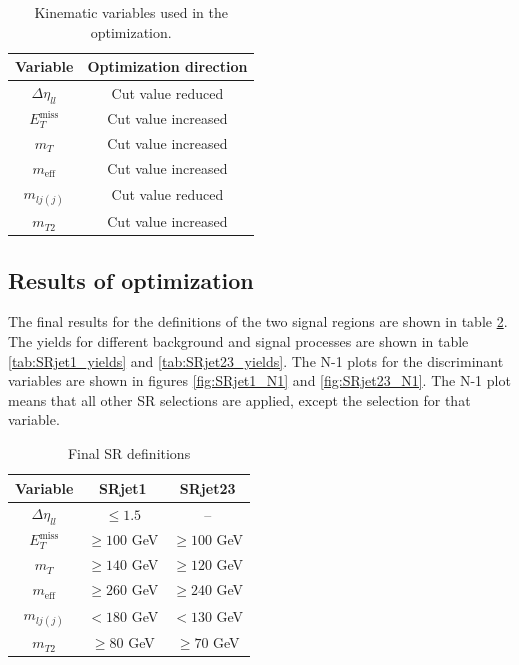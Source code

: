 \begin{table}[htbp]
\centering
\begin{tabular}{|c|c|}
\hline
Variable & Optimization direction \\
\hline
\hline
$\Delta \eta_{ll}$ & Cut value reduced \\
\hline
$E_T^{\text{miss}}$ & Cut value increased \\
\hline
$m_T$ & Cut value increased \\
\hline
$m_{\text{eff}}$ & Cut value increased \\
\hline
$m_{lj(j)}$ & Cut value reduced \\
\hline
$m_{T2}$ & Cut value increased \\
\hline
\end{tabular}
\caption{Kinematic variables used in the optimization.}
\label{tab:variables_optimization}
\end{table}

\subsection{Results of optimization}
The final results for the definitions of the two signal regions are shown in table \ref{tab:SR_Def}.
The yields for different background and signal processes are shown in table \ref{tab:SRjet1_yields} and \ref{tab:SRjet23_yields}.
The N-1 plots for the discriminant variables are shown in figures \ref{fig:SRjet1_N1} and \ref{fig:SRjet23_N1}.
The N-1 plot means that all other SR selections are applied, except the selection for that variable.

\begin{table}[htpb]
\centering
\begin{tabular}{|c|c|c|}
\hline
Variable &  SRjet1 & SRjet23 \\ \hline
$\Delta\eta_{ll}$ & $\leq 1.5$ &  -- \\
$E_T^{\text{miss}}$ &  $\geq 100 $ GeV  & $\geq 100$ GeV\\
$m_T$ & $\geq 140$ GeV & $\geq 120$ GeV \\
$m_{\text{eff}}$ & $\geq 260$ GeV &  $\geq 240$ GeV\\
$m_{lj(j)}$ & $< 180$ GeV &  $< 130$ GeV\\
$m_{T2}$ & $\geq 80$ GeV&  $\geq 70$ GeV \\
\hline
\end{tabular}
\caption{Final SR definitions}
\label{tab:SR_Def}
\end{table}


